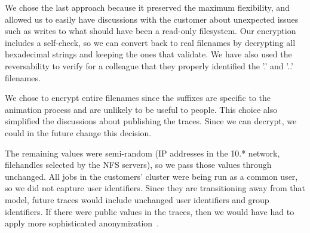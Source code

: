 We chose the last approach because it preserved the maximum
flexibility, and allowed us to easily have discussions with the
customer about unexpected issues such as writes to what should have
been a read-only filesystem.  Our encryption includes a self-check, so
we can convert back to real filenames by decrypting all hexadecimal
strings and keeping the ones that validate.  We have also used the
reversability to verify for a colleague that they properly identified
the '.' and '..' filenames.

We chose to encrypt entire filenames since the suffixes are specific
to the animation process and are unlikely to be useful to people.
This choice also simplified the discussions about publishing the
traces.  Since we can decrypt, we could in the future change this
decision.

The remaining values were semi-random (IP addresses in the 10.*
network, filehandles selected by the NFS servers), so we pass those values
through unchanged.  All jobs in the customers' cluster were being run
as a common user, so we did not capture user identifiers.  Since they are
transitioning away from that model, future traces would include
unchanged user identifiers and group identifiers.  If there were public values in the traces,
then we would have had to apply more sophisticated
anonymization~\cite{ruoming07anonymization}.

